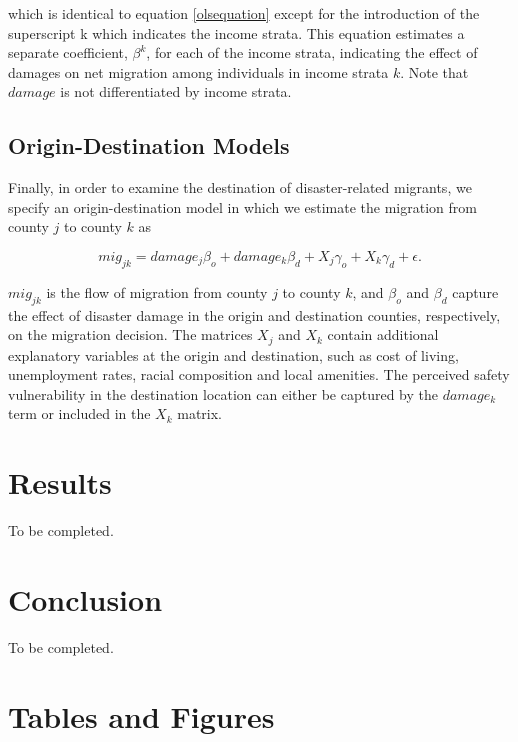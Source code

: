 \documentclass[]{article}
\begin{document}
which is identical to equation \ref{olsequation} except for the
introduction of the superscript k which indicates the income strata.
This equation estimates a separate coefficient, \(\beta^k\), for each of
the income strata, indicating the effect of damages on net migration
among individuals in income strata \(k\). Note that \(damage\) is not
differentiated by income strata.

\subsection{Origin-Destination Models}\label{origin-destination-models}

Finally, in order to examine the destination of disaster-related
migrants, we specify an origin-destination model in which we estimate
the migration from county \(j\) to county \(k\) as

\begin{equation}
  mig_{jk} = damage_j \beta_o + damage_k \beta_d + X_j \gamma_o + X_k \gamma_d + \epsilon .
\end{equation}

\(mig_{jk}\) is the flow of migration from county \(j\) to county \(k\),
and \(\beta_o\) and \(\beta_d\) capture the effect of disaster damage in
the origin and destination counties, respectively, on the migration
decision. The matrices \(X_j\) and \(X_k\) contain additional
explanatory variables at the origin and destination, such as cost of
living, unemployment rates, racial composition and local amenities. The
perceived safety vulnerability in the destination location can either be
captured by the \(damage_k\) term or included in the \(X_k\) matrix.

\section{Results}\label{results}

To be completed.

\section{Conclusion}\label{conclusion}

To be completed.

\section{Tables and Figures}\label{tables-and-figures}
\end{document}
